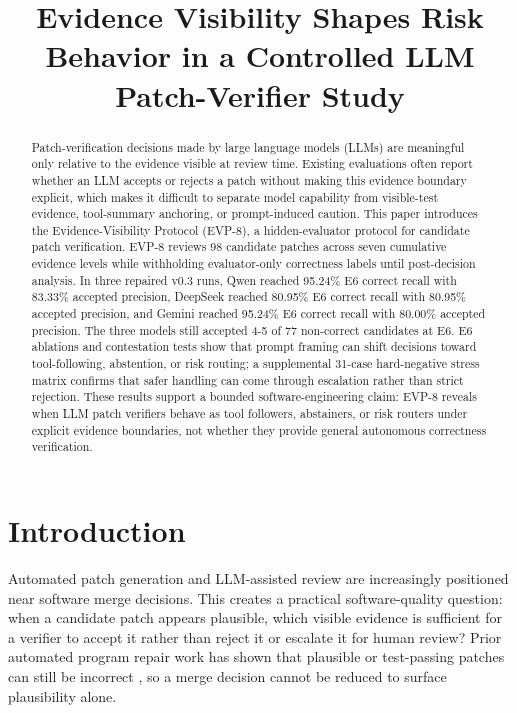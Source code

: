 \documentclass[conference]{IEEEtran}
\title{Evidence Visibility Shapes Risk Behavior in a Controlled LLM Patch-Verifier Study}
\author{\IEEEauthorblockN{Anonymous Authors}\IEEEauthorblockA{Anonymous Institution}}
\begin{document}
\maketitle




\begin{abstract}

Patch-verification decisions made by large language models (LLMs) are meaningful only relative to the evidence visible at review time. Existing evaluations often report whether an LLM accepts or rejects a patch without making this evidence boundary explicit, which makes it difficult to separate model capability from visible-test evidence, tool-summary anchoring, or prompt-induced caution. This paper introduces the Evidence-Visibility Protocol (EVP-8), a hidden-evaluator protocol for candidate patch verification. EVP-8 reviews 98 candidate patches across seven cumulative evidence levels while withholding evaluator-only correctness labels until post-decision analysis. In three repaired v0.3 runs, Qwen reached 95.24\% E6 correct recall with 83.33\% accepted precision, DeepSeek reached 80.95\% E6 correct recall with 80.95\% accepted precision, and Gemini reached 95.24\% E6 correct recall with 80.00\% accepted precision. The three models still accepted 4-5 of 77 non-correct candidates at E6. E6 ablations and contestation tests show that prompt framing can shift decisions toward tool-following, abstention, or risk routing; a supplemental 31-case hard-negative stress matrix confirms that safer handling can come through escalation rather than strict rejection. These results support a bounded software-engineering claim: EVP-8 reveals when LLM patch verifiers behave as tool followers, abstainers, or risk routers under explicit evidence boundaries, not whether they provide general autonomous correctness verification.

\end{abstract}
\section{Introduction}

Automated patch generation and LLM-assisted review are increasingly positioned near software merge decisions. This creates a practical software-quality question: when a candidate patch appears plausible, which visible evidence is sufficient for a verifier to accept it rather than reject it or escalate it for human review? Prior automated program repair work has shown that plausible or test-passing patches can still be incorrect \cite{qi_issta_2015_patch_plausibility,legoues_icse_2012_genprog}, so a merge decision cannot be reduced to surface plausibility alone.
\end{document}

